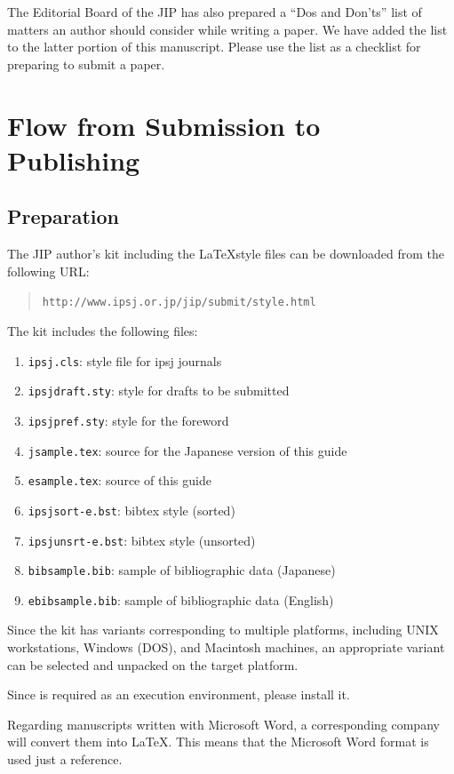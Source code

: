 \documentclass[submit,ses,english]{ipsj-lualatex} %
\def\|{\verb|}
\begin{document}
The Editorial Board of the JIP has also prepared a ``Dos and Don'ts''
list of matters an author should consider while writing a paper.  We
have added the list to the latter portion of this manuscript.  Please
use the list as a checklist for preparing to submit a paper.

%2
\section{Flow from Submission to Publishing}
%2.1
\subsection{Preparation}

The JIP author's kit including the \LaTeX style files can be downloaded
from the following URL:
\begin{quote}
 \small
 \|http://www.ipsj.or.jp/jip/submit/style.html|
\end{quote}
The kit includes the following files:
\begin{enumerate}%
\item \|ipsj.cls|: style file for ipsj journals
\item \|ipsjdraft.sty|: style for drafts to be submitted
\item \|ipsjpref.sty|: style for the foreword
\item \|jsample.tex|: source for the Japanese version of this guide
\item \|esample.tex|: source of this guide
\item \|ipsjsort-e.bst|: bibtex style (sorted)
\item \|ipsjunsrt-e.bst|: bibtex style (unsorted)
\item \|bibsample.bib|: sample of bibliographic data (Japanese)
\item \|ebibsample.bib|: sample of bibliographic data (English)
\end{enumerate}%

Since the kit has variants corresponding to multiple platforms,
including UNIX workstations, Windows (DOS), and Macintosh machines, an
appropriate variant can be selected and unpacked on the target
platform. 

Since {\LaTeXe} is required as an execution environment, please install
it.

Regarding manuscripts written with Microsoft Word, a corresponding
company will convert them into \LaTeX\@.  This means that the Microsoft
Word format is used just a reference.
\end{document}
